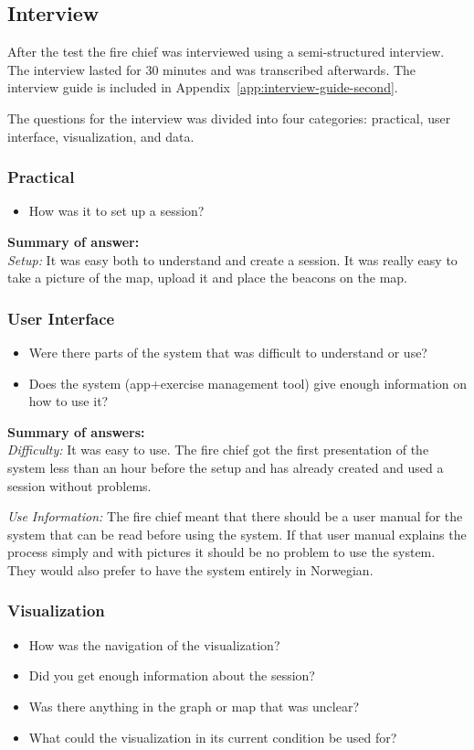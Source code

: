 \documentclass[../Main/thesis.tex]{subfiles}
\begin{document}
\subsection{Interview}
After the test the fire chief was interviewed using a semi-structured interview.
The interview lasted for 30 minutes and was transcribed afterwards.
The interview guide is included in Appendix~\ref{app:interview-guide-second}.

The questions for the interview was divided into four categories: practical, user interface, visualization, and data.

\subsubsection*{Practical}
\begin{itemize}
	\item How was it to set up a session?
\end{itemize}

\textbf{Summary of answer:}\\
\textit{Setup:}
It was easy both to understand and create a session. 
It was really easy to take a picture of the map, upload it and place the beacons on the map.

\subsubsection*{User Interface}
\begin{itemize}
	\item Were there parts of the system that was difficult to understand or use?
	\item Does the system (app+exercise management tool) give enough information on how to use it?
\end{itemize}

\textbf{Summary of answers:}\\
\textit{Difficulty:}
It was easy to use. 
The fire chief got the first presentation of the system less than an hour before the setup and has already created and used a session without problems.

\textit{Use Information:}
The fire chief meant that there should be a user manual for the system that can be read before using the system. 
If that user manual explains the process simply and with pictures it should be no problem to use the system.
They would also prefer to have the system entirely in Norwegian. 

\subsubsection*{Visualization}
\begin{itemize}
	\item How was the navigation of the visualization?
	\item Did you get enough information about the session?
	\item Was there anything in the graph or map that was unclear?
	\item What could the visualization in its current condition be used for?
\end{itemize}
\end{document}
